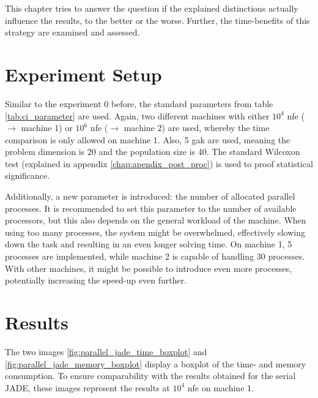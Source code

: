 \documentclass[./\jobname.tex]{subfiles}
\begin{document}
This chapter tries to answer the question if the explained distinctions actually influence the results, to the better or the worse. Further, the time-benefits of this strategy are examined and assessed.

\section{Experiment Setup}
Similar to the experiment 0 before, the standard parameters from table \ref{tab:ci_parameter} are used. Again, two different machines with either $10^4$ \gls{nfe} ($\rightarrow$ machine 1) or $10^6$ \gls{nfe} ($\rightarrow$ machine 2) are used, whereby the time comparison is only allowed on machine 1. Also, 5 \gls{gak} are used, meaning the problem dimension is 20 and the population size is 40. The standard Wilcoxon test (explained in appendix \ref{chap:apendix_post_proc}) is used to proof statistical significance. 

Additionally, a new parameter is introduced: the number of allocated parallel processes. It is recommended to set this parameter to the number of available processors, but this also depends on the general workload of the machine. When using too many processes, the system might be overwhelmed, effectively slowing down the task and resulting in an even longer solving time. On machine 1, 5 processes are implemented, while machine 2 is capable of handling 30 processes. With other machines, it might be possible to introduce even more processes, potentially increasing the speed-up even further. 

\section{Results}

The two images \ref{fig:parallel_jade_time_boxplot} and \ref{fig:parallel_jade_memory_boxplot} display a boxplot of the time- and memory consumption. To ensure comparability with the results obtained for the serial JADE, these images represent the results at $10^4$ \gls{nfe} on machine 1. 
\end{document}
